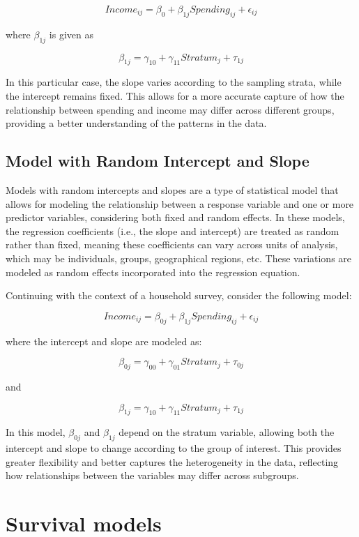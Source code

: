 \documentclass[
  12pt,
]{book}
\begin{document}
\[
Income_{ij} = \beta_{0} + \beta_{1j} Spending_{ij} + \epsilon_{ij}
\]

where \(\beta_{1j}\) is given as

\[
\beta_{1j} = \gamma_{10} + \gamma_{11} Stratum_{j} + \tau_{1j}
\]

In this particular case, the slope varies according to the sampling strata, while the intercept remains fixed. This allows for a more accurate capture of how the relationship between spending and income may differ across different groups, providing a better understanding of the patterns in the data.

\hypertarget{model-with-random-intercept-and-slope}{%
\subsection{Model with Random Intercept and Slope}\label{model-with-random-intercept-and-slope}}

Models with random intercepts and slopes are a type of statistical model that allows for modeling the relationship between a response variable and one or more predictor variables, considering both fixed and random effects. In these models, the regression coefficients (i.e., the slope and intercept) are treated as random rather than fixed, meaning these coefficients can vary across units of analysis, which may be individuals, groups, geographical regions, etc. These variations are modeled as random effects incorporated into the regression equation.

Continuing with the context of a household survey, consider the following model:

\[
Income_{ij} = \beta_{0j} + \beta_{1j} Spending_{ij} + \epsilon_{ij}
\]

where the intercept and slope are modeled as:

\[
\beta_{0j} = \gamma_{00} + \gamma_{01} Stratum_{j} + \tau_{0j}
\]

and

\[
\beta_{1j} = \gamma_{10} + \gamma_{11} Stratum_{j} + \tau_{1j}
\]

In this model, \(\beta_{0j}\) and \(\beta_{1j}\) depend on the stratum variable, allowing both the intercept and slope to change according to the group of interest. This provides greater flexibility and better captures the heterogeneity in the data, reflecting how relationships between the variables may differ across subgroups.

\hypertarget{survival-models}{%
\section{Survival models}\label{survival-models}}
\end{document}
